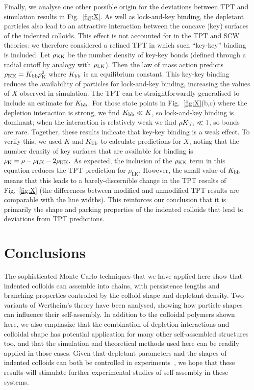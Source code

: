 \documentclass[10pt,onside,singlecolumn]{article}
\newcommand{\rhoK}{\rho_\mathrm{K}}
\newcommand{\rhoLK}{\rho_\mathrm{LK}}
\begin{document}
Finally, we analyse one other possible origin for the deviations between TPT and simulation results
in Fig.~\ref{fig:X}.  As well as lock-and-key binding, the depletant particles also lead to an
attractive interaction between the concave (key) surfaces of the indented colloids.  This effect is
not accounted for in the TPT and SCW theories: we therefore considered a refined TPT in which
such ``key-key'' binding is included.  Let $\rho_{\rm KK}$ be the number density of key-key bonds 
(defined through a radial cutoff by analogy with $\rho_{\rm LK}$).  
Then the law of mass action predicts
$
 \rho_{\rm KK} = K_{\rm bb} \rho_{\rm K}^2
$
where $K_{\rm bb}$ 
is an equilibrium constant.  This key-key binding reduces the availability of particles for lock-and-key binding,
increasing the values of $X$ observed in simulation.  The TPT can be straightforwardly generalised
to include an estimate for $K_{\rm bb}$.  For those state points in Fig.~\ref{fig:X}(b,c)  
where the depletion interaction is strong, we find
 $K_{\rm bb} \ll K$, so lock-and-key binding is dominant; 
 when the interaction is relatively weak we find $\rho K_{\rm bb} \ll 1$, so bonds are rare.  Together, these results indicate
that key-key binding is a weak effect.  To verify this, we used $K$ and $K_{\rm bb}$ to calculate predictions
for $X$, noting
that the number density of key surfaces that are available for binding is 
$
  \rhoK = \rho  - \rhoLK - 2\rho_{\rm KK}.
$
As expected, the inclusion of the $\rho_{\rm KK}$ term in this equation reduces the TPT prediction for $\rhoLK$.  However,
the small value of $K_{\rm bb}$ means that this leads to a barely-discernible change in the TPT results
of Fig.~\ref{fig:X} (the differences between modified and unmodified TPT results are 
comparable with the line widths).  This reinforces our conclusion that it is primarily the shape and packing
properties of the indented colloids that lead to deviations from TPT predictions.



\section{Conclusions} \label{sec:conclusions}

The sophisticated Monte Carlo techniques that we have applied here
show that indented colloids can assemble into chains, with persistence
lengths and branching properties controlled by the colloid shape
and depletant density.  Two variants of Wertheim's theory have been analysed, showing
how particle shapes can influence their self-assembly.  
In addition to the colloidal polymers shown here, we also emphasize that the combination
of depletion interactions and colloidal shape has potential application for many other self-assembled
structures too, and that the simulation and theoretical methods used here can be readily applied in those cases.
Given that depletant parameters and the shapes of indented colloids can both be controlled in 
experiments~\cite{Sacanna:2010ys,Sacanna2011,sacanna13,Bahadur2012,Rossi11,Alsayed04,Savage09}, we hope that these results will
stimulate further experimental studies of self-assembly in these systems.
\end{document}

